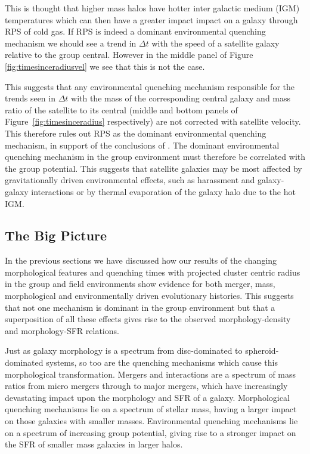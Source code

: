 \documentclass[useAMS,usenatbib]{mn2e}
\begin{document}
This is thought that higher mass halos have hotter inter galactic medium (IGM) temperatures which can then have a greater impact impact on a galaxy through RPS of cold gas. If RPS is indeed a dominant environmental quenching mechanism we should see a trend in $\Delta t$ with the speed of a satellite galaxy relative to the group central.  However in the middle panel of Figure \ref{fig:timesinceradiusvel} we see that this is not the case. 

This suggests that any environmental quenching mechanism responsible for the trends seen in $\Delta t$ with the mass of the corresponding central galaxy and mass ratio of the satellite to its central (middle and bottom panels of Figure~\ref{fig:timesinceradius} respectively) are not corrected with satellite velocity. This therefore rules out RPS as the dominant environmental quenching mechanism, in support of the conclusions of \citet{emerick16, fillingham16}.  The dominant environmental quenching mechanism in the group environment must therefore be correlated with the group potential. This suggests that satellite galaxies may be most affected by gravitationally driven environmental effects, such as harassment and galaxy-galaxy interactions or by thermal evaporation of the galaxy halo due to the hot IGM. 

\subsection{The Big Picture}\label{sec:bigpic}

In the previous sections we have discussed how our results of the changing morphological features and quenching times with projected cluster centric radius in the group and field environments show evidence for both merger, mass, morphological and environmentally driven evolutionary histories. This suggests that not one mechanism is dominant in the group environment but that a superposition of all these effects gives rise to the observed morphology-density and morphology-SFR relations.

Just as galaxy morphology is a spectrum from disc-dominated to spheroid-dominated systems, so too are the quenching mechanisms which cause this morphological transformation. Mergers and interactions are a spectrum of mass ratios from micro mergers \citep{carlin16} through to major mergers, which have increasingly devastating impact upon the morphology and SFR of a galaxy. Morphological quenching mechanisms lie on a spectrum of stellar mass, having a larger impact on those galaxies with smaller masses. Environmental quenching mechanisms lie on a spectrum of increasing group potential, giving rise to a stronger impact on the SFR of smaller mass galaxies in larger halos.  
\end{document}
